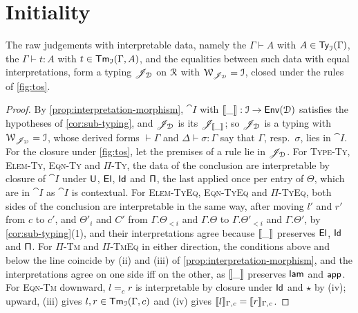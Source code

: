 \section{Initiality}
\label{sec:initiality}

\begin{proposition}\label{prop:typing-relation}
    The raw judgements with interpretable data, namely the $\Gamma \vdash A$ with $A \in \mathsf{Ty}_{\mathcal{I}}(\Gamma)$, the $\Gamma \vdash t : A$ with $t \in \mathsf{Tm}_{\mathcal{I}}(\Gamma, A)$, and the equalities between such data with equal interpretations, form a typing $\mathscr{J}_{\mathcal{D}}$ on $\mathcal{R}$ with $\mathcal{W}_{\mathscr{J}_{\mathcal{D}}} = \mathcal{I}$, closed under the rules of \cref{fig:tos}.
\end{proposition}

\begin{proof}
    By \cref{prop:interpretation-morphism}, $\cat{I}$ with $\llbracket\_\rrbracket : \mathcal{I} \to \mathsf{Env}(\mathcal{D})$ satisfies the hypotheses of \cref{cor:sub-typing}, and $\mathscr{J}_{\mathcal{D}}$ is its $\mathscr{J}_{\llbracket\_\rrbracket}$; so $\mathscr{J}_{\mathcal{D}}$ is a typing with $\mathcal{W}_{\mathscr{J}_{\mathcal{D}}} = \mathcal{I}$, whose derived forms $\vdash \Gamma$ and $\Delta \vdash \sigma : \Gamma$ say that $\Gamma$, resp.\ $\sigma$, lies in $\cat{I}$. For the closure under \cref{fig:tos}, let the premises of a rule lie in $\mathscr{J}_{\mathcal{D}}$. For \textsc{Type-Ty}, \textsc{Elem-Ty}, \textsc{Eqn-Ty} and \textsc{$\Pi$-Ty}, the data of the conclusion are interpretable by closure of $\cat{I}$ under $\mathsf{U}$, $\mathsf{El}$, $\mathsf{Id}$ and $\mathsf{\Pi}$, the last applied once per entry of $\Theta$, which are in $\cat{I}$ as $\cat{I}$ is contextual. For \textsc{Elem-TyEq}, \textsc{Eqn-TyEq} and \textsc{$\Pi$-TyEq}, both sides of the conclusion are interpretable in the same way, after moving $l'$ and $r'$ from $c$ to $c'$, and $\Theta'_i$ and $C'$ from $\Gamma.\Theta_{<i}$ and $\Gamma.\Theta$ to $\Gamma.\Theta'_{<i}$ and $\Gamma.\Theta'$, by \cref{cor:sub-typing}(1), and their interpretations agree because $\llbracket\_\rrbracket$ preserves $\mathsf{El}$, $\mathsf{Id}$ and $\mathsf{\Pi}$. For \textsc{$\Pi$-Tm} and \textsc{$\Pi$-TmEq} in either direction, the conditions above and below the line coincide by (ii) and (iii) of \cref{prop:interpretation-morphism}, and the interpretations agree on one side iff on the other, as $\llbracket\_\rrbracket$ preserves $\mathsf{lam}$ and $\mathsf{app}$. For \textsc{Eqn-Tm} downward, $l =_c r$ is interpretable by closure under $\mathsf{Id}$ and $\star$ by (iv); upward, (iii) gives $l, r \in \mathsf{Tm}_{\mathcal{I}}(\Gamma, c)$ and (iv) gives $\llbracket l\rrbracket_{\Gamma, c} = \llbracket r\rrbracket_{\Gamma, c}$.
\end{proof}


